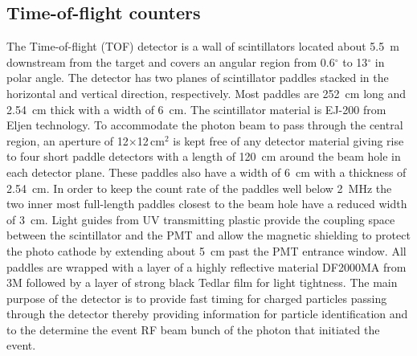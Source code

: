 \subsection[Time-of-flight counters (Beni)]{Time-of-flight counters \label{sec:tof}}
The Time-of-flight (TOF) detector is a wall of scintillators located about 5.5~m downstream from the target and covers 
an angular region from 0.6$^{\circ}$ to 13$^{\circ}$ in polar angle. The detector has two planes of
scintillator paddles stacked in the horizontal and vertical direction, respectively. Most paddles are 252~cm long and 2.54~cm
thick with a width of 6~cm. 
The scintillator material is EJ-200 from Eljen technology.
To accommodate the photon beam to pass through the central region,
an aperture of 12$\times$12\,cm$^2$ is kept
free of any detector material giving rise to four short paddle detectors with a length of 120~cm around the beam hole
in each detector plane. These paddles also have a width of 6~cm with a thickness of 2.54~cm. In order to keep the
count rate of the paddles well below 2~MHz the two inner most full-length paddles closest to the beam hole have a reduced width of 3~cm.
Light guides from UV transmitting plastic provide the coupling space between the scintillator and the PMT and allow the 
magnetic shielding to protect the photo cathode by extending about 5~cm past the PMT entrance window. All paddles are wrapped
with a layer of a highly reflective material DF2000MA from 3M followed by a layer of strong black Tedlar film for light tightness. 
The main purpose of the detector is to provide fast timing for charged particles passing through the detector thereby providing information for particle identification and to the determine the event RF beam bunch of the photon that initiated the event.

